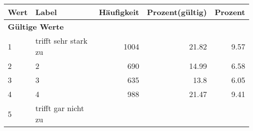      \begin{longtable}{lXrrr}
     \toprule
     \textbf{Wert} & \textbf{Label} & \textbf{Häufigkeit} & \textbf{Prozent(gültig)} & \textbf{Prozent} \\
     \endhead
     \midrule
     \multicolumn{5}{l}{\textbf{Gültige Werte}}\\

     1 &
     \multicolumn{1}{X}{ trifft sehr stark zu   } &


       \num{1004} &
       \num[round-mode=places,round-precision=2]{21,82} &
         \num[round-mode=places,round-precision=2]{9,57} \\

     2 &
     \multicolumn{1}{X}{ 2   } &


       \num{690} &
       \num[round-mode=places,round-precision=2]{14,99} &
         \num[round-mode=places,round-precision=2]{6,58} \\

     3 &
     \multicolumn{1}{X}{ 3   } &


       \num{635} &
       \num[round-mode=places,round-precision=2]{13,8} &
         \num[round-mode=places,round-precision=2]{6,05} \\

     4 &
     \multicolumn{1}{X}{ 4   } &


       \num{988} &
       \num[round-mode=places,round-precision=2]{21,47} &
         \num[round-mode=places,round-precision=2]{9,41} \\

     5 &
     \multicolumn{1}{X}{ trifft gar nicht zu   } &



\end{longtable}
